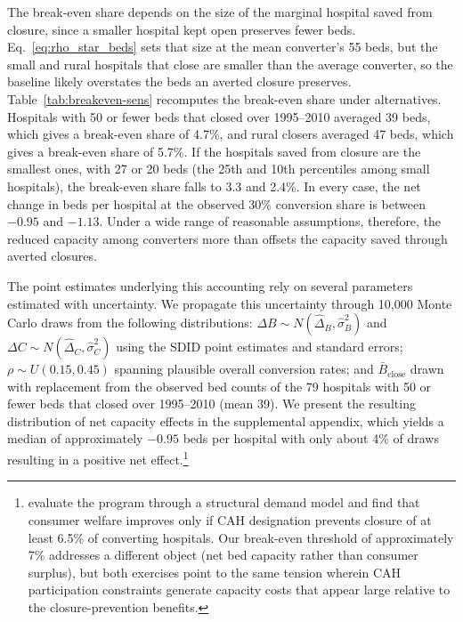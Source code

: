 \documentclass[a4paper, 12pt, twoside]{article}
\begin{document}
The break-even share depends on the size of the marginal hospital saved from closure, since a smaller hospital kept open preserves fewer beds. Eq.~\eqref{eq:rho_star_beds} sets that size at the mean converter's 55 beds, but the small and rural hospitals that close are smaller than the average converter, so the baseline likely overstates the beds an averted closure preserves. Table~\ref{tab:breakeven-sens} recomputes the break-even share under alternatives. Hospitals with 50 or fewer beds that closed over 1995--2010 averaged 39 beds, which gives a break-even share of 4.7\%, and rural closers averaged 47 beds, which gives a break-even share of 5.7\%. If the hospitals saved from closure are the smallest ones, with 27 or 20 beds (the 25th and 10th percentiles among small hospitals), the break-even share falls to 3.3 and 2.4\%. In every case, the net change in beds per hospital at the observed 30\% conversion share is between $-0.95$ and $-1.13$. Under a wide range of reasonable assumptions, therefore, the reduced capacity among converters more than offsets the capacity saved through averted closures.

The point estimates underlying this accounting rely on several parameters estimated with uncertainty. We propagate this uncertainty through 10,000 Monte Carlo draws from the following distributions: $\Delta B \sim N(\hat\Delta_B, \hat\sigma_B^2)$ and $\Delta C \sim N(\hat\Delta_C, \hat\sigma_C^2)$ using the SDID point estimates and standard errors; $\rho \sim U(0.15, 0.45)$ spanning plausible overall conversion rates; and $\bar B_{\text{close}}$ drawn with replacement from the observed bed counts of the 79 hospitals with 50 or fewer beds that closed over 1995--2010 (mean 39). We present the resulting distribution of net capacity effects in the supplemental appendix, which yields a median of approximately $-0.95$ beds per hospital with only about 4\% of draws resulting in a positive net effect.\footnote{\cite{gowrisankaran2018} evaluate the program through a structural demand model and find that consumer welfare improves only if CAH designation prevents closure of at least 6.5\% of converting hospitals. Our break-even threshold of approximately 7\% addresses a different object (net bed capacity rather than consumer surplus), but both exercises point to the same tension wherein CAH participation constraints generate capacity costs that appear large relative to the closure-prevention benefits.}
\end{document}
